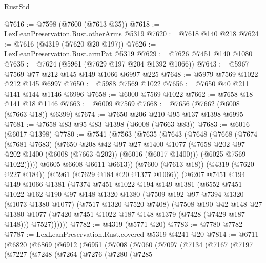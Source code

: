 \begin{lexlean}{RustStd}
\begin{coremodule}
@7616 := @7598 (@7600 (@7613 @35))
@7618 := LexLeanPreservation.Rust.otherArms @5319
@7620 := @7618 @140 @218
@7624 := @7616 (@4319 (@7620 @20 @197))
@7626 := LexLeanPreservation.Rust.armPat @5319
@7629 := @7626 @7451 @140 @1080
@7635 := @7624 (@5961 (@7629 @197 @204 @1392 @1066))
@7643 := @5967 @7569 @77 @212 @145 @149 @1066 @6997 @225
@7648 := @5979 @7569 @1022 @212 @145 @6997
@7650 := @5988 @7569 @1022
@7656 := @7650 @40 @211 @141 @144 @1146 @6996
@7658 := @6000 @7569 @1022
@7662 := @7658 @18 @141 @18 @1146
@7663 := @6009 @7569
@7668 := @7656 (@7662 (@6008 (@7663 @18)) @6399)
@7674 := @7650 @206 @210 @95 @137 @1398 @6995
@7681 := @7658 @83 @95 @83 @1398 (@6008 (@7663 @83))
@7683 := @6016 (@6017 @1398)
@7780 := @7541
    (@7563
      (@7635
        (@7643
          (@7648
            (@7668
              (@7674
                (@7681 @7683)
                (@7650
                  @208
                  @42
                  @97
                  @27
                  @1400
                  @1077
                  (@7658 @202 @97 @202 @1400 (@6008 (@7663 @202)) (@6016 (@6017 @1400)))
                  (@6025 @7569 @1022)))))
          @6605
          @6608
          @6611
          @6613))
      (@7600 (@7613 @18))
      (@4319 (@7620 @227 @184))
      (@5961 (@7629 @184 @20 @1377 @1066))
      (@6207
        @7451
        @194
        @149
        @1066
        @1381
        (@7374
          @7451
          @1022
          @194
          @149
          @1381
          (@6552
            @7451
            @1022
            @162
            @190
            @97
            @148
            @1320
            @1380
            (@7509
              @192
              @97
              @7394
              @1320
              (@1073 @1380 @1077)
              (@7517 @1320 @7520 @7408)
              (@7508
                @190
                @42
                @148
                @27
                @1380
                @1077
                (@7420 @7451 @1022 @187 @148 @1379 (@7428 (@7429 @187 @148)))
                @7527))))))
@7782 := @4319 (@5771 @20)
@7783 := @7780 @7782
@7787 := LexLeanPreservation.Rust.covered @5319 @4241 @20
@7814 := @6711
    (@6820
      (@6869
        (@6912
          (@6951
            (@7008
              (@7060
                (@7097
                  (@7134
                    (@7167
                      (@7197
                        (@7227
                          (@7248
                            (@7264
                              (@7276
                                (@7280
                                  (@7285

\end{coremodule}
\end{lexlean}
